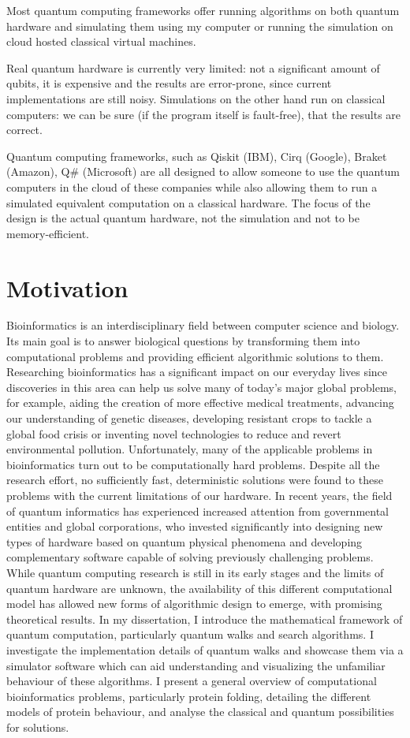 Most quantum computing frameworks offer running algorithms on both quantum hardware and simulating them using my computer or running the simulation on cloud hosted classical virtual machines.

Real quantum hardware is currently very limited: not a significant amount of qubits, it is expensive and the results are error-prone, since current implementations are still noisy. Simulations on the other hand run on classical computers: we can be sure (if the program itself is fault-free), that the results are correct. 

Quantum computing frameworks, such as Qiskit (IBM), Cirq (Google), Braket (Amazon), Q# (Microsoft) are all designed to allow someone to use the quantum computers in the cloud of these companies while also allowing them to run a simulated equivalent computation on a classical hardware. The focus of the design is the actual quantum hardware, not the simulation and not to be memory-efficient.

\chapter{Motivation}

Bioinformatics is an interdisciplinary field between computer science and biology. Its main goal is to answer biological questions by transforming them into computational problems and providing efficient algorithmic solutions to them. Researching bioinformatics has a significant impact on our everyday lives since discoveries in this area can help us solve many of today’s major global problems, for example, aiding the creation of more effective medical treatments, advancing our understanding of genetic diseases, developing resistant crops to tackle a global food crisis or inventing novel technologies to reduce and revert environmental pollution. Unfortunately, many of the applicable problems in bioinformatics turn out to be computationally hard problems. Despite all the research effort, no sufficiently fast, deterministic solutions were found to these problems with the current limitations of our hardware. In recent years, the field of quantum informatics has experienced increased attention from governmental entities and global corporations, who invested significantly into designing new types of hardware based on quantum physical phenomena and developing complementary software capable of solving previously challenging problems. While quantum computing research is still in its early stages and the limits of quantum hardware are unknown, the availability of this different computational model has allowed new forms of algorithmic design to emerge, with promising theoretical results. In my dissertation, I introduce the mathematical framework of quantum computation, particularly quantum walks and search algorithms. I investigate the implementation details of quantum walks and showcase them via a simulator software which can aid understanding and visualizing the unfamiliar behaviour of these algorithms. I present a general overview of computational bioinformatics problems, particularly protein folding, detailing the different models of protein behaviour, and analyse the classical and quantum possibilities for solutions. 

